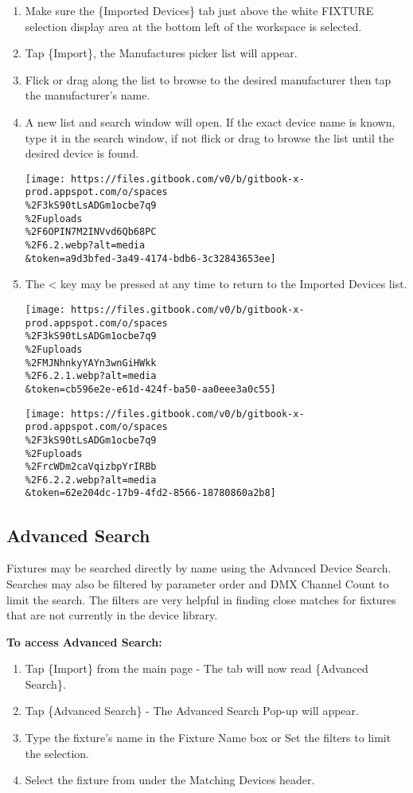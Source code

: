 \documentclass[
]{article}
\begin{document}
\begin{enumerate}
\def\labelenumi{\arabic{enumi}.}
\item
  Make sure the \{Imported Devices\} tab just above the white FIXTURE selection display area at the bottom left of the workspace is selected.
\item
  Tap \{Import\}, the Manufactures picker list will appear.
\item
  Flick or drag along the list to browse to the desired manufacturer then tap the manufacturer's name.
\item
  A new list and search window will open. If the exact device name is known, type it in the search window, if not flick or drag to browse the list until the desired device is found.

  \texttt{[image: https://files.gitbook.com/v0/b/gitbook-x-prod.appspot.com/o/spaces\\\%2F3kS90tLsADGm1ocbe7q9\\\%2Fuploads\\\%2F6OPIN7M2INVvd6Qb68PC\\\%2F6.2.webp?alt=media\\\&token=a9d3bfed-3a49-4174-bdb6-3c32843653ee]}
\item
  The \textless{} key may be pressed at any time to return to the Imported Devices list.

  \texttt{[image: https://files.gitbook.com/v0/b/gitbook-x-prod.appspot.com/o/spaces\\\%2F3kS90tLsADGm1ocbe7q9\\\%2Fuploads\\\%2FMJNhnkyYAYn3wnGiHWkk\\\%2F6.2.1.webp?alt=media\\\&token=cb596e2e-e61d-424f-ba50-aa0eee3a0c55]}

  \texttt{[image: https://files.gitbook.com/v0/b/gitbook-x-prod.appspot.com/o/spaces\\\%2F3kS90tLsADGm1ocbe7q9\\\%2Fuploads\\\%2FrcWDm2caVqizbpYrIRBb\\\%2F6.2.2.webp?alt=media\\\&token=62e204dc-17b9-4fd2-8566-18780860a2b8]}
\end{enumerate}

\hypertarget{advanced-search}{%
\subsection{Advanced Search}\label{advanced-search}}

Fixtures may be searched directly by name using the Advanced Device Search. Searches may also be filtered by parameter order and DMX Channel Count to limit the search. The filters are very helpful in finding close matches for fixtures that are not currently in the device library.

\textbf{To access Advanced Search:}

\begin{enumerate}
\def\labelenumi{\arabic{enumi}.}
\item
  Tap \{Import\} from the main page - The tab will now read \{Advanced Search\}.
\item
  Tap \{Advanced Search\} - The Advanced Search Pop-up will appear.
\item
  Type the fixture's name in the Fixture Name box or Set the filters to limit the selection.
\item
  Select the fixture from under the Matching Devices header.
\end{enumerate}
\end{document}
